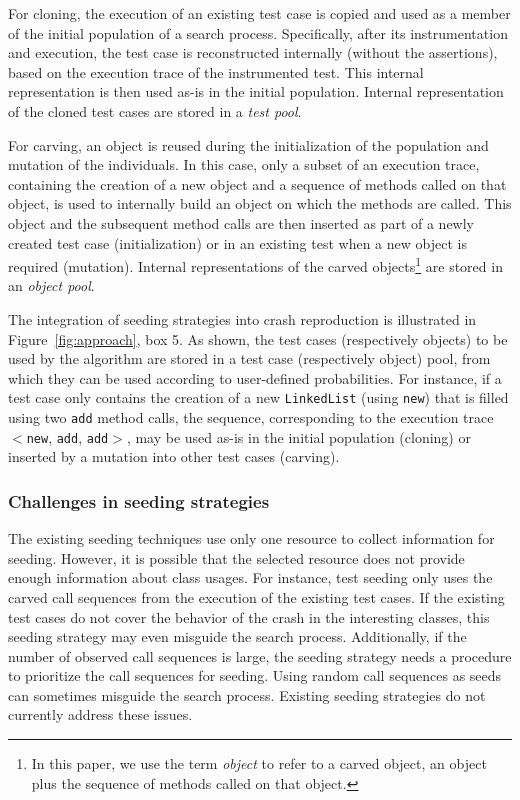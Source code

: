 For cloning, the execution of an existing test case is copied and used as a member of the initial population of a search process. Specifically, after its instrumentation and execution, the test case is reconstructed internally (without the assertions), based on the execution trace of the instrumented test. This internal representation is then used as-is in the initial population. Internal representation of the cloned test cases are stored in a \emph{test pool}.

For carving, an object is reused during the initialization of the population and mutation of the individuals.
In this case, only a subset of an execution trace, containing the creation of a new object and a sequence of methods called on that object, is used to internally build an object on which the methods are called. This object and the subsequent method calls are then inserted as part of a newly created test case (initialization) or in an existing test when a new object is required (mutation). Internal representations of the carved objects\footnote{In this paper, we use the term \emph{object} to refer to a carved object, \ie an object plus the sequence of methods called on that object.} are stored in an \emph{object pool}.

The integration of seeding strategies into crash reproduction is illustrated in Figure~\ref{fig:approach}, box 5.
As shown, the test cases (respectively objects) to be used by the algorithm are stored in a test case (respectively object) pool, from which they can be used according to user-defined probabilities.
For instance, if a test case only contains the creation of a new \texttt{LinkedList} (using \texttt{new}) that is  filled using two \texttt{add} method calls, the sequence, corresponding to the execution trace $<$\texttt{new}, \texttt{add}, \texttt{add}$>$, may be used as-is in the initial population (cloning) or inserted by a mutation into other test cases (carving).

\subsubsection{Challenges in seeding strategies}

The existing seeding techniques use only one resource to collect information for seeding. However, it is possible that the selected resource does not provide enough information about class usages. For instance, test seeding only uses the carved call sequences from the execution of the existing test cases. If the existing test cases do not cover the behavior of the crash in the interesting classes, this seeding strategy may even misguide the search process. Additionally, if the number of observed call sequences is large, the seeding strategy needs a procedure to prioritize the call sequences for seeding. Using random call sequences as seeds can sometimes misguide the search process. Existing seeding strategies do not currently address these issues.

